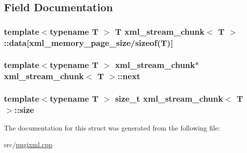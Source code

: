 \subsection{Field Documentation}
\hypertarget{structxml__stream__chunk_a365e2e228a0277467b25a0fea42b8518}{
\subsubsection[{data}]{\setlength{\rightskip}{0pt plus 5cm}template$<$typename T $>$ T {\bf xml\_\-stream\_\-chunk}$<$ T $>$::{\bf data}\mbox{[}{\bf xml\_\-memory\_\-page\_\-size}/sizeof(T)\mbox{]}}}
\label{structxml__stream__chunk_a365e2e228a0277467b25a0fea42b8518}
\hypertarget{structxml__stream__chunk_ad00071f7340adb2bde7c4157d4100b3c}{
\subsubsection[{next}]{\setlength{\rightskip}{0pt plus 5cm}template$<$typename T $>$ {\bf xml\_\-stream\_\-chunk}$\ast$ {\bf xml\_\-stream\_\-chunk}$<$ T $>$::{\bf next}}}
\label{structxml__stream__chunk_ad00071f7340adb2bde7c4157d4100b3c}
\hypertarget{structxml__stream__chunk_a42618ba3b7bda1246cfc640149fc34eb}{
\subsubsection[{size}]{\setlength{\rightskip}{0pt plus 5cm}template$<$typename T $>$ size\_\-t {\bf xml\_\-stream\_\-chunk}$<$ T $>$::{\bf size}}}
\label{structxml__stream__chunk_a42618ba3b7bda1246cfc640149fc34eb}


The documentation for this struct was generated from the following file:\begin{DoxyCompactItemize}
\item 
src/\hyperlink{pugixml_8cpp}{pugixml.cpp}\end{DoxyCompactItemize}

